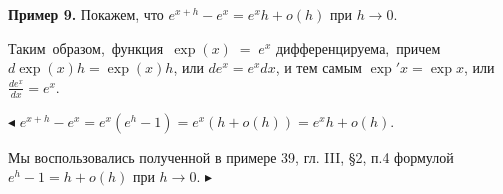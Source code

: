 \documentclass[a5paper,16pt]{book} %
\begin{document}
	\textbf{Пример 9.} Покажем, что $e ^{x+h} - e ^{x} = e ^{x}h + o(h)$ при $h \to 0$.
	
	Таким\, образом,\, функция\, $\exp (x)\; =\; e^x$ дифференцируема,\, причем \\$d\exp (x)h = \exp (x)h$, или $de^x = e^xdx$, и тем самым $\exp 'x = \exp x$, или $\frac{de^x}{dx} = e^x$.
	
	$\blacktriangleleft$
	$e^{x+h} - e^x = e^x(e^h - 1) = e^x(h + o(h)) = e^xh + o(h)$.
	
	Мы воспользовались полученной в примере 39, гл. III, §2, п.4 формулой $e^h - 1 = h + o(h)$ при $h \to 0$.
	$\blacktriangleright$
\end{document}
